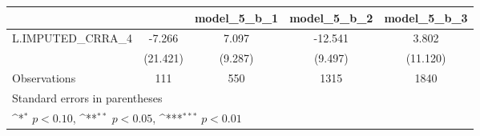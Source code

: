 {
\def\sym#1{\ifmmode^{#1}\else\(^{#1}\)\fi}
\begin{tabular}{l*{4}{c}}
\toprule
                &\multicolumn{1}{c}{}&\multicolumn{1}{c}{model\_5\_b\_1}&\multicolumn{1}{c}{model\_5\_b\_2}&\multicolumn{1}{c}{model\_5\_b\_3}\\
\midrule
L.IMPUTED\_CRRA\_4&   -7.266         &    7.097         &  -12.541         &    3.802         \\
                & (21.421)         &  (9.287)         &  (9.497)         & (11.120)         \\
\midrule
Observations    &      111         &      550         &     1315         &     1840         \\
\bottomrule
\multicolumn{5}{l}{\footnotesize Standard errors in parentheses}\\
\multicolumn{5}{l}{\footnotesize \sym{*} \(p<0.10\), \sym{**} \(p<0.05\), \sym{***} \(p<0.01\)}\\
\end{tabular}
}
